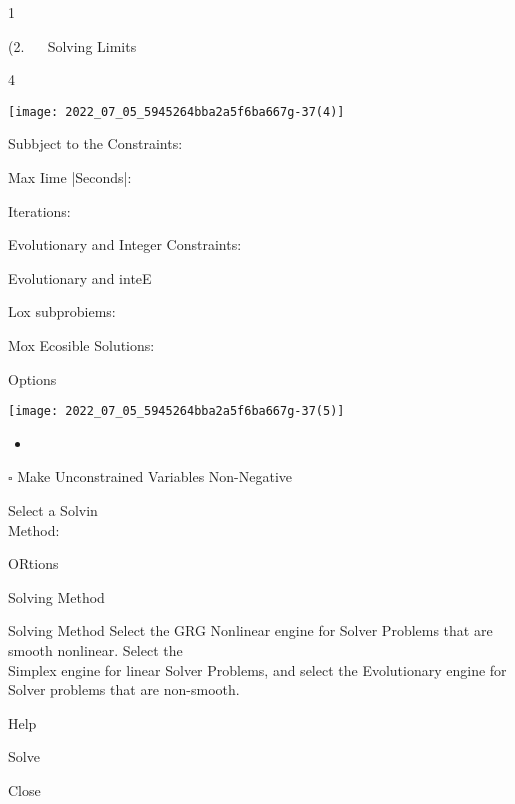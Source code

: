 1

(2. $\quad$ Solving Limits

4

\texttt{[image: 2022\_07\_05\_5945264bba2a5f6ba667g-37(4)]}

Subbject to the Constraints:

Max Iime |Seconds|:

Iterations:

Evolutionary and Integer Constraints:

Evolutionary and inteE

Lox subprobiems:

Mox Ecosible Solutions:

Options

\texttt{[image: 2022\_07\_05\_5945264bba2a5f6ba667g-37(5)]}

\begin{itemize}
  \item 
\end{itemize}
$\square$ Make Unconstrained Variables Non-Negative

Select a Solvin\\
Method:

ORtions

Solving Method

Solving Method Select the GRG Nonlinear engine for Solver Problems that are smooth nonlinear. Select the\\
Simplex engine for linear Solver Problems, and select the Evolutionary engine for Solver problems that are non-smooth.

Help

Solve

Close
